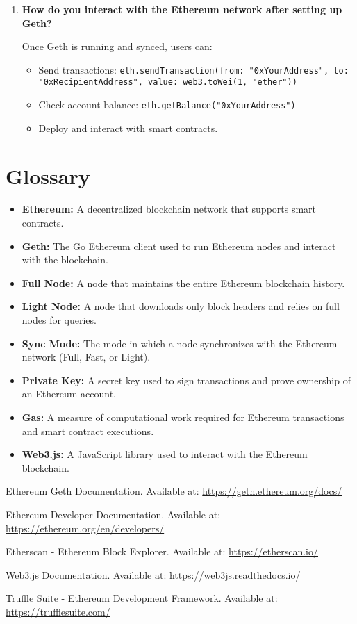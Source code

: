 \documentclass[11pt]{article}
\begin{document}
\begin{enumerate}
    \item \textbf{How do you interact with the Ethereum network after setting up Geth?}
    
    Once Geth is running and synced, users can:
    \begin{itemize}
        \item Send transactions:  
        \texttt{eth.sendTransaction({from: "0xYourAddress", 
        to: "0xRecipientAddress", value: web3.toWei(1, "ether")})}
        \item Check account balance:  
        \texttt{eth.getBalance("0xYourAddress")}
        \item Deploy and interact with smart contracts.
    \end{itemize}

\end{enumerate}

\section{Glossary}

\begin{itemize}
    \item \textbf{Ethereum:} A decentralized blockchain network that supports smart contracts.
    \item \textbf{Geth:} The Go Ethereum client used to run Ethereum nodes and interact with the blockchain.
    \item \textbf{Full Node:} A node that maintains the entire Ethereum blockchain history.
    \item \textbf{Light Node:} A node that downloads only block headers and relies on full nodes for queries.
    \item \textbf{Sync Mode:} The mode in which a node synchronizes with the Ethereum network (Full, Fast, or Light).
    \item \textbf{Private Key:} A secret key used to sign transactions and prove ownership of an Ethereum account.
    \item \textbf{Gas:} A measure of computational work required for Ethereum transactions and smart contract executions.
    \item \textbf{Web3.js:} A JavaScript library used to interact with the Ethereum blockchain.
\end{itemize}

\clearpage

\begin{thebibliography}{9}
     Ethereum Geth Documentation. Available at: \url{https://geth.ethereum.org/docs/}
    
     Ethereum Developer Documentation. Available at: \url{https://ethereum.org/en/developers/}
    
     Etherscan - Ethereum Block Explorer. Available at: \url{https://etherscan.io/}
    
     Web3.js Documentation. Available at: \url{https://web3js.readthedocs.io/}
    
     Truffle Suite - Ethereum Development Framework. Available at: \url{https://trufflesuite.com/}
\end{thebibliography}
\end{document}

